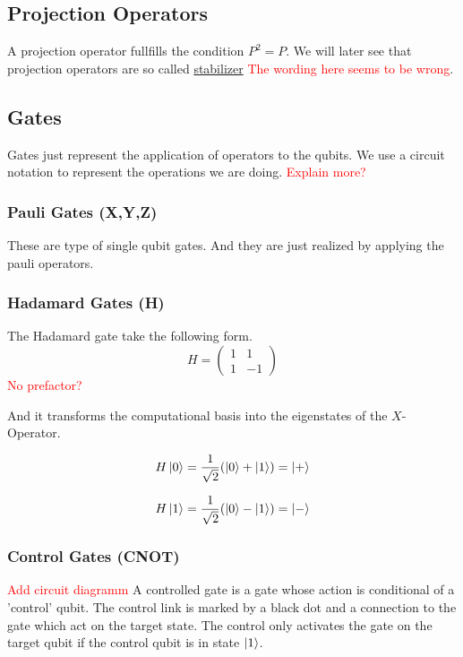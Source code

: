 \subsection{Projection Operators}\label{sec:basic.math.projection_operator}
A projection operator fullfills the condition $P^2=P$.
We will later see that projection operators are so called \hyperref[sec:basic.qc.stabilizer]{stabilizer}
\textcolor{red}{The wording here seems to be wrong}.


\subsection{Gates}\label{sec:basic.math.gates}
Gates just represent the application of operators to the qubits. 
We use a circuit notation to represent the operations we are doing.
\textcolor{red}{Explain more?}


\subsubsection{Pauli Gates (X,Y,Z)}\label{sec:basic.math.gates.paui}
These are type of single qubit gates. And they are just realized by applying the pauli operators. 


\subsubsection{Hadamard Gates (H)}\label{sec:basic.math.gates.hadamard}
The Hadamard gate take the following form.
\begin{equation}
H=    
\begin{pmatrix}
1 & 1  \\
1 & -1  
\end{pmatrix}
\end{equation}
\textcolor{red}{No prefactor?}

And it transforms the computational basis into the eigenstates of the $X$-Operator.

\begin{equation}
    H\ket{0} = \frac{1}{\sqrt{2}} (\ket{0} + \ket{1}) = \ket{+}
\end{equation}

\begin{equation}
    H\ket{1} = \frac{1}{\sqrt{2}} (\ket{0} - \ket{1}) = \ket{-}
\end{equation}
\cite{QECintro}


\subsubsection{Control Gates (CNOT)}\label{sec:basic.math.gates.cnot}
\textcolor{red}{Add circuit diagramm}
A controlled gate is a gate whose action is conditional of a 'control' qubit.
The control link is marked by a black dot and a connection to the gate which act on the target state. 
The control only activates the gate on the target qubit if the control qubit is in state $\ket{1}$.

